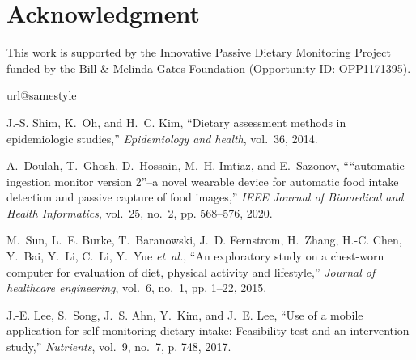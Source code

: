 \documentclass[journal]{IEEEtran}
\begin{document}
\section*{Acknowledgment}
This work is supported by the Innovative Passive Dietary Monitoring Project funded by the Bill \& Melinda Gates Foundation (Opportunity ID: OPP1171395).






% 

\begin{thebibliography}{10}
\providecommand{\url}[1]{#1}
\csname url@samestyle\endcsname
\providecommand{\newblock}{\relax}
\providecommand{\bibinfo}[2]{#2}
\providecommand{\BIBentrySTDinterwordspacing}{\spaceskip=0pt\relax}
\providecommand{\BIBentryALTinterwordstretchfactor}{4}
\providecommand{\BIBentryALTinterwordspacing}{\spaceskip=\fontdimen2\font plus
\BIBentryALTinterwordstretchfactor\fontdimen3\font minus
  \fontdimen4\font\relax}
\providecommand{\BIBforeignlanguage}[2]{{%
\expandafter\ifx\csname l@#1\endcsname\relax
\typeout{** WARNING: IEEEtran.bst: No hyphenation pattern has been}%
\typeout{** loaded for the language `#1'. Using the pattern for}%
\typeout{** the default language instead.}%
\else
\language=\csname l@#1\endcsname
\fi
#2}}
\providecommand{\BIBdecl}{\relax}
\BIBdecl

J.-S. Shim, K.~Oh, and H.~C. Kim, ``Dietary assessment methods in epidemiologic
  studies,'' \emph{Epidemiology and health}, vol.~36, 2014.

A.~Doulah, T.~Ghosh, D.~Hossain, M.~H. Imtiaz, and E.~Sazonov, ``“automatic
  ingestion monitor version 2”--a novel wearable device for automatic food
  intake detection and passive capture of food images,'' \emph{IEEE Journal of
  Biomedical and Health Informatics}, vol.~25, no.~2, pp. 568--576, 2020.

M.~Sun, L.~E. Burke, T.~Baranowski, J.~D. Fernstrom, H.~Zhang, H.-C. Chen,
  Y.~Bai, Y.~Li, C.~Li, Y.~Yue \emph{et~al.}, ``An exploratory study on a
  chest-worn computer for evaluation of diet, physical activity and
  lifestyle,'' \emph{Journal of healthcare engineering}, vol.~6, no.~1, pp.
  1--22, 2015.

J.-E. Lee, S.~Song, J.~S. Ahn, Y.~Kim, and J.~E. Lee, ``Use of a mobile
  application for self-monitoring dietary intake: Feasibility test and an
  intervention study,'' \emph{Nutrients}, vol.~9, no.~7, p. 748, 2017.


\end{thebibliography}
\end{document}
